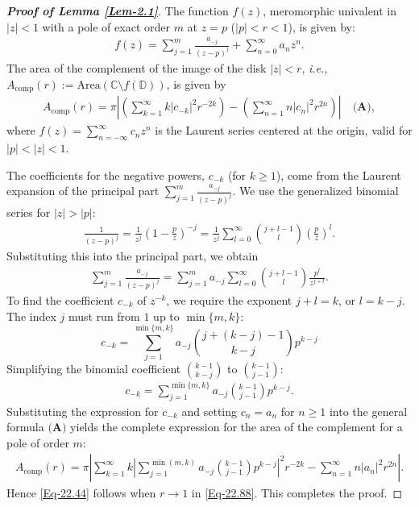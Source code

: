 \documentclass[a4paper,12pt]{amsart}
\theoremstyle{plain}
\theoremstyle{definition}
\begin{document}
\begin{proof}[\bf Proof of Lemma \ref{Lem-2.1}]
	The function $f(z)$, meromorphic univalent in $|z|<1$ with a pole of exact order $m$ at $z=p$ ($|p|<r<1$), is given by:
	\begin{align*}
		f(z) = \sum_{j=1}^{m}\frac{a_{-j}}{(z-p)^j} + \sum_{n=0}^{\infty} a_n z^n.
	\end{align*}
	The area of the complement of the image of the disk $|z|<r$, \emph{i.e.,} $A_{\text{comp}}(r):=\mbox{Area}(\mathbb{C}\setminus f(\mathbb{D}))$, is given by 
	\begin{align*}
		A_{\text{comp}}(r) = \pi \left| \left( \sum_{k=1}^{\infty} k |c_{-k}|^2 r^{-2k} \right) - \left( \sum_{n=1}^{\infty} n |c_n|^2 r^{2n} \right) \right| \quad \textbf{(A)},
	\end{align*}
	where $f(z) = \sum_{n=-\infty}^{\infty} c_n z^n$ is the Laurent series centered at the origin, valid for $|p|<|z|<1$. 
	
	The coefficients for the negative powers, $c_{-k}$ (for $k \ge 1$), come from the Laurent expansion of the principal part $\sum_{j=1}^{m}\frac{a_{-j}}{(z-p)^j}$. We use the generalized binomial series for $|z| > |p|$:
\begin{align*}
	\frac{1}{(z-p)^j} = \frac{1}{z^j} \left(1-\frac{p}{z}\right)^{-j} = \frac{1}{z^j} \sum_{l=0}^{\infty} \binom{j+l-1}{l} \left(\frac{p}{z}\right)^l.
\end{align*}
	Substituting this into the principal part, we obtain
	\begin{align*}
		\sum_{j=1}^{m}\frac{a_{-j}}{(z-p)^j} = \sum_{j=1}^{m} a_{-j} \sum_{l=0}^{\infty} \binom{j+l-1}{l} \frac{p^l}{z^{j+l}}.
	\end{align*}
	To find the coefficient $c_{-k}$ of $z^{-k}$, we require the exponent $j+l = k$, or $l = k-j$. The index $j$ must run from $1$ up to $\min\{m, k\}$:
	$$c_{-k} = \sum_{j=1}^{\min\{m, k\}} a_{-j} \binom{j+(k-j)-1}{k-j} p^{k-j}$$
	Simplifying the binomial coefficient $\binom{k-1}{k-j}$ to $\binom{k-1}{j-1}$:
	\begin{align*}
		{c_{-k} = \sum_{j=1}^{\min\{m, k\}} a_{-j} \binom{k-1}{j-1} p^{k-j}}.
	\end{align*}
	Substituting the expression for $c_{-k}$ and setting $c_n=a_n$ for $n \ge 1$ into the general formula $\textbf{(A)}$ yields the complete expression for the area of the complement for a pole of order $m$:
	\begin{align}\label{Eq-22.88}
		A_{\text{comp}}(r) = \pi \left| \sum_{k=1}^{\infty} k \left| \sum_{j=1}^{\min(m, k)} a_{-j} \binom{k-1}{j-1} p^{k-j} \right|^2 r^{-2k} - \sum_{n=1}^{\infty} n |a_{n}|^2 r^{2n} \right|.
	\end{align}
	Hence \eqref{Eq-22.44} follows when $r\to 1$ in \eqref{Eq-22.88}. This completes the proof.
\end{proof}
\end{document}
